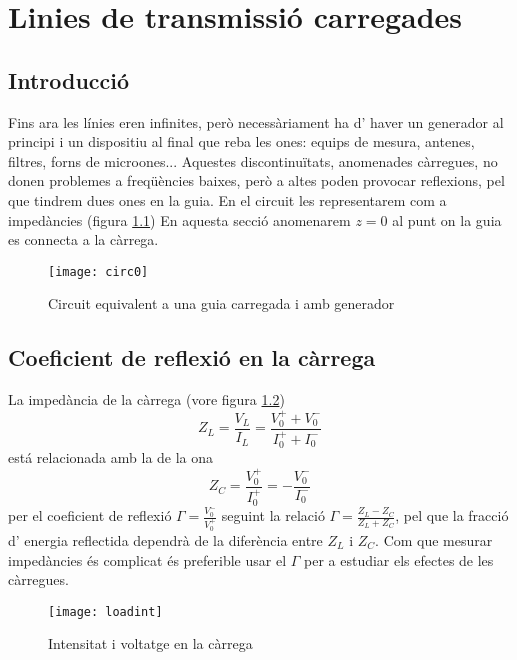 \chapter{Linies de transmissió carregades}

\section{Introducció}

Fins ara les línies eren infinites, però necessàriament ha d' haver un generador al principi i un dispositiu al final que reba les ones: equips de mesura, antenes, filtres, forns de microones... Aquestes discontinuïtats, anomenades càrregues, no donen problemes a freqüències baixes, però a altes poden provocar reflexions, pel que tindrem dues ones en la guia. En el circuit les representarem com a impedàncies (figura \cref{circeq})  En aquesta secció anomenarem $z=0$ al punt on la guia es connecta a la càrrega.
\begin{figure}[ht]
  \centering
  \texttt{[image: circ0]}
  \caption{Circuit equivalent a una guia carregada i amb generador}
  \label{circeq}
  \vspace{-2 em}
\end{figure}

\section{Coeficient de reflexió en la càrrega}

La impedància de la càrrega (vore figura \cref{genplusload})
\begin{equation}
  Z_L = \frac{V_L}{I_L} = \frac{V_0 ^+ + V_0 ^-}{I_0 ^+ + I_0 ^-}
\end{equation}
 está relacionada amb la de la ona
\begin{equation}
  Z_C = \frac{V_0 ^+}{I_0^+} = - \frac{V_0 ^-}{I_0 ^-}
\end{equation}
per el coeficient de reflexió $\Gamma = \frac{V_0 ^-}{V_0 ^+}$ seguint la relació $\Gamma = \frac{Z_L - Z_C}{Z_L + Z_C}$, pel que la fracció d' energia reflectida dependrà de la diferència entre $Z_L$ i $Z_C$. Com que mesurar impedàncies és complicat és preferible usar el $\Gamma $ per a estudiar els efectes de les càrregues.
\begin{figure}[ht]
  \centering
  \texttt{[image: loadint]}
  \caption{Intensitat i voltatge en la càrrega}
  \label{genplusload}
\end{figure}

